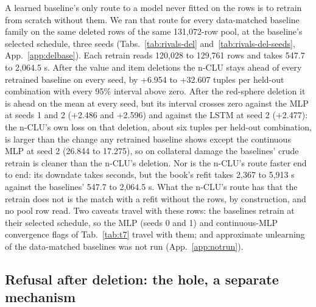 \documentclass{article} %
\begin{document}
A learned baseline's only route to a model never fitted on the rows is to retrain from scratch without them. We ran
that route for every data-matched baseline family on the same deleted rows of the same 131,072-row %
pool, at the baseline's selected schedule, three seeds (Tabs.~\ref{tab:rivals-del}
and~\ref{tab:rivals-del-seeds}, App.~\ref{app:delbase}). Each retrain reads 120,028 to 129,761 %
rows and takes 547.7 to 2,064.5 s. After the value and item deletions the n-CLU stays ahead of every %
retrained baseline on every seed, by +6.954 to +32.607 tuples per held-out combination with every 95\% interval above %
zero. After the red-sphere deletion it is ahead on the mean at every seed, but its interval crosses
zero against the MLP at seeds 1 and 2 (+2.486 and +2.596) and against the LSTM at seed 2 %
(+2.477): the n-CLU's own loss on that deletion, about six tuples per held-out combination, is larger than the %
change any retrained baseline shows except the continuous MLP at seed 2 (26.844 to 17.275), so on %
collateral damage the baselines' crude retrain is cleaner than the n-CLU's deletion. Nor is the
n-CLU's route faster end to end: its downdate takes seconds, but the book's refit takes 2,367 to %
5,913 s against the baselines' 547.7 to 2,064.5 s. What the n-CLU's route has that the retrain does not %
is the match with a refit without the rows, by construction, and no pool row read. Two caveats travel with these rows: the baselines
retrain at their selected schedule, so the MLP (seeds 0 and 1) and continuous-MLP convergence flags
of Tab.~\ref{tab:t7} travel with them; and approximate unlearning of the data-matched baselines was not
run (App.~\ref{app:notrun}).

\subsection{Refusal after deletion: the hole, a separate mechanism}
\label{sec:hole}
\end{document}
